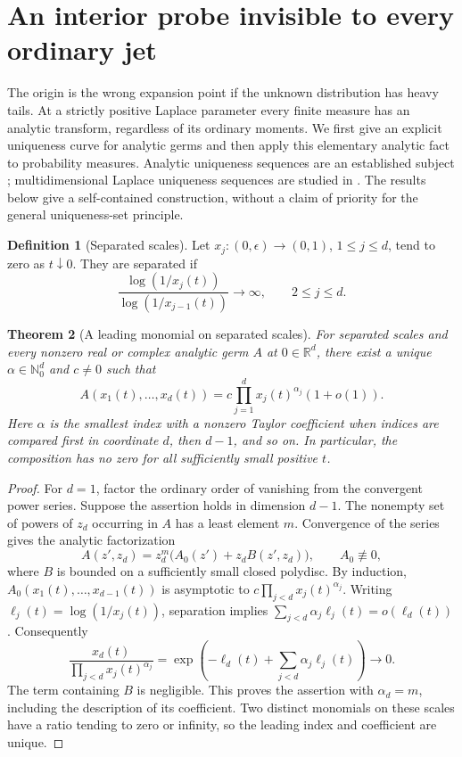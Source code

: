 \documentclass[11pt,letterpaper]{article}
\newtheorem{theorem}{Theorem}[section]
\theoremstyle{definition}
\newtheorem{definition}[theorem]{Definition}
\theoremstyle{remark}
\newcommand{\1}{\mathbf 1}
\begin{document}
\section{An interior probe invisible to every ordinary jet}
\label{p08:sec:flat-probe}

The origin is the wrong expansion point if the unknown distribution has
heavy tails.  At a strictly positive Laplace parameter every finite
measure has an analytic transform, regardless of its ordinary moments.
We first give an explicit uniqueness curve for analytic germs and then
apply this elementary analytic fact to probability measures.  Analytic
uniqueness sequences are an established subject
\cite{BoivinGauthierManolaki2018}; multidimensional Laplace uniqueness
sequences are studied in \cite{Kostic2025}.  The results below give a
self-contained construction, without a claim of priority for the
general uniqueness-set principle.

\begin{definition}[Separated scales]
Let $x_j:(0,\epsilon)\to(0,1)$, $1\le j\le d$, tend to zero as
$t\downarrow0$.  They are separated if
\[
 \frac{\log(1/x_j(t))}{\log(1/x_{j-1}(t))}\longrightarrow\infty,
 \qquad 2\le j\le d.
\]
\end{definition}

\begin{theorem}[A leading monomial on separated scales]
\label{p08:thm:flat-leading}
For separated scales and every nonzero real or complex analytic germ
$A$ at $0\in\mathbb R^d$, there exist a unique
$\alpha\in\mathbb N_0^d$ and $c\ne0$ such that
\begin{equation}
 A(x_1(t),\ldots,x_d(t))
   =c\prod_{j=1}^d x_j(t)^{\alpha_j}(1+o(1)).
 \label{p08:eq:flat-leading}
\end{equation}
Here $\alpha$ is the smallest index with a nonzero Taylor coefficient
when indices are compared first in coordinate $d$, then $d-1$, and so
on.  In particular, the composition has no zero for all sufficiently
small positive $t$.
\end{theorem}

\begin{proof}
For $d=1$, factor the ordinary order of vanishing from the convergent
power series.  Suppose the assertion holds in dimension $d-1$.
The nonempty set of powers of $z_d$ occurring in $A$ has a least
element $m$.  Convergence of the series gives the analytic factorization
\[
 A(z',z_d)=z_d^m\bigl(A_0(z')+z_d B(z',z_d)\bigr),
 \qquad A_0\not\equiv0,
\]
where $B$ is bounded on a sufficiently small closed polydisc.
By induction, $A_0(x_1(t),\ldots,x_{d-1}(t))$
is asymptotic to $c\prod_{j<d}x_j(t)^{\alpha_j}$.
Writing $\ell_j(t)=\log(1/x_j(t))$, separation implies
$\sum_{j<d}\alpha_j\ell_j(t)=o(\ell_d(t))$.  Consequently
\[
 \frac{x_d(t)}{\prod_{j<d}x_j(t)^{\alpha_j}}
 =\exp\left(-\ell_d(t)+\sum_{j<d}\alpha_j\ell_j(t)\right)
 \longrightarrow0.
\]
The term containing $B$ is negligible.  This proves the assertion with
$\alpha_d=m$, including the description of its coefficient.
Two distinct monomials on these scales have a ratio tending to zero
or infinity, so the leading index and coefficient are unique.
\end{proof}
\end{document}

